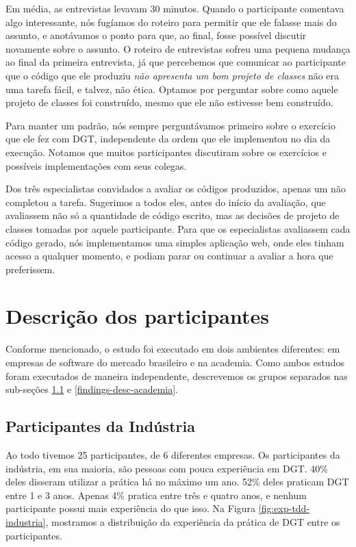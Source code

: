 Em média, as entrevistas levavam 30 minutos. Quando o participante comentava
algo interessante, nós fugíamos do roteiro para permitir que ele falasse mais do assunto,
e anotávamos o ponto para que, ao final, fosse possível discutir novamente sobre o assunto.
O roteiro de entrevistas sofreu uma pequena mudança ao final da primeira entrevista,
já que percebemos que comunicar ao participante que o código que ele produziu
\textit{não apresenta um bom projeto de classes} não era uma tarefa fácil, e talvez, não ética. 
Optamos por perguntar sobre como aquele projeto de classes foi construído, mesmo que ele
não estivesse bem construído.

Para manter um padrão, nós sempre perguntávamos primeiro sobre o exercício que ele
fez com DGT, independente da ordem que ele implementou no dia da execução. Notamos
que muitos participantes discutiram sobre os exercícios e possíveis implementações com seus colegas.

Dos três especialistas convidados a avaliar os códigos produzidos, apenas um não
completou a tarefa. Sugerimos a todos eles, antes do início da avaliação, que avaliassem
não só a quantidade de código escrito, mas as decisões de projeto de classes tomadas por aquele
participante. Para que os especialistas avaliassem cada código gerado, nós implementamos
uma simples aplicação web, onde eles tinham acesso a qualquer momento, e podiam parar ou continuar
a avaliar a hora que preferissem.

\section{Descrição dos participantes}
\label{sec:desc-participantes}

Conforme mencionado, o estudo foi executado em dois ambientes diferentes: em empresas de software
do mercado brasileiro e na academia. Como ambos estudos foram executados de maneira independente,
descrevemos os grupos separados nas sub-seções \ref{findings-desc-industria} e \ref{findings-desc-academia}.

\subsection{Participantes da Indústria}
\label{findings-desc-industria}

Ao todo tivemos 25 participantes, de 6 diferentes empresas.
Os participantes da indústria, em sua maioria, são pessoas com pouca experiência em DGT.
40\% deles disseram utilizar a prática há no máximo um ano. 52\% deles praticam DGT
entre 1 e 3 anos. Apenas 4\% pratica entre três e quatro anos, e nenhum participante
possui mais experiência do que isso. Na Figura \ref{fig:exp-tdd-industria}, mostramos
a distribuição da experiência da prática de DGT entre os participantes.

